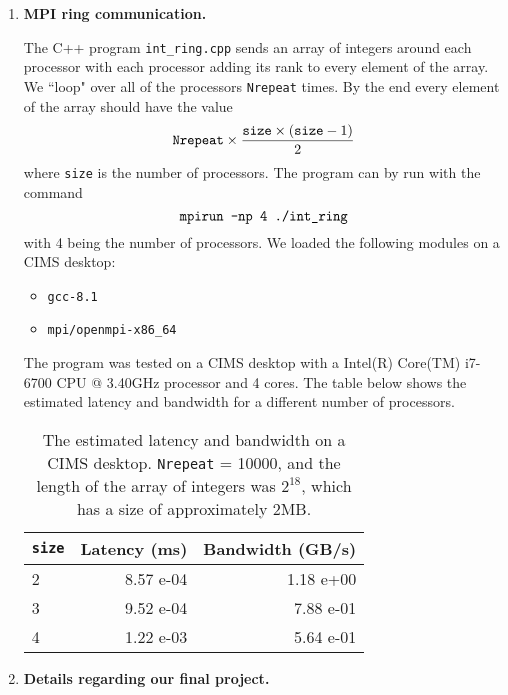 \documentclass[12pt]{article}
\begin{document}
\begin{enumerate}

\item {\bf MPI ring communication.}  

The C++ program {\tt int\_ring.cpp} sends an array of integers around each processor with each processor adding its rank to every element of the array.  We ``loop" over all of the processors {\tt Nrepeat} times.  By the end every element of the array should have the value
\[
\text{\tt Nrepeat} \times \frac{\text{\tt size} \times (\text{\tt size} - 1)}{2}
\]
where {\tt size} is the number of processors.  The program can by run with the command
\[
\text{\tt mpirun -np 4 ./int\_ring}
\]
with 4 being the number of processors.  We loaded the following modules on a CIMS desktop:
\begin{itemize}{}
\item {\tt gcc-8.1}
\item {\tt mpi/openmpi-x86\_64}
\end{itemize}
The program was tested on a CIMS desktop with a Intel(R) Core(TM) i7-6700 CPU @ 3.40GHz processor and 4 cores.  The table below shows the estimated latency and bandwidth for a different number of processors.

\begin{table}[H]
\centering
\begin{tabular}{l | r  r}
{\tt size} & Latency (ms) & Bandwidth (GB/s)\\
\hline
2 & 8.57 e-04 & 1.18 e+00\\
3 & 9.52 e-04 & 7.88 e-01\\
4 & 1.22 e-03 & 5.64 e-01
\end{tabular}
\caption{The estimated latency and bandwidth on a CIMS desktop.  {\tt Nrepeat} = 10000, and the length of the array of integers was $2^{18}$, which has a size of approximately 2MB.}
\label{table:table1}
\end{table}



\item {\bf Details regarding our final project.}


\end{enumerate}
\end{document}

